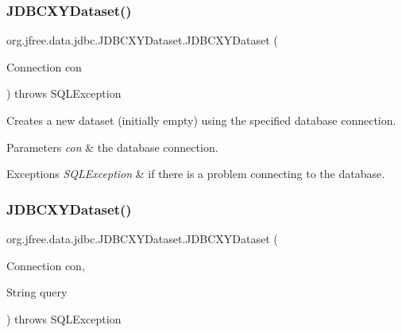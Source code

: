 \subsubsection{\texorpdfstring{J\+D\+B\+C\+X\+Y\+Dataset()}{JDBCXYDataset()}\hspace{0.1cm}{\footnotesize\ttfamily [2/3]}}
{\footnotesize\ttfamily org.\+jfree.\+data.\+jdbc.\+J\+D\+B\+C\+X\+Y\+Dataset.\+J\+D\+B\+C\+X\+Y\+Dataset (\begin{DoxyParamCaption}\item[{Connection}]{con }\end{DoxyParamCaption}) throws S\+Q\+L\+Exception}

Creates a new dataset (initially empty) using the specified database connection.


\begin{DoxyParams}{Parameters}
{\em con} & the database connection.\\
\hline
\end{DoxyParams}

\begin{DoxyExceptions}{Exceptions}
{\em S\+Q\+L\+Exception} & if there is a problem connecting to the database. \\
\hline
\end{DoxyExceptions}
\mbox{\label{classorg_1_1jfree_1_1data_1_1jdbc_1_1_j_d_b_c_x_y_dataset_afdd30de451cb1515ccb314be5516eb96}} 
\subsubsection{\texorpdfstring{J\+D\+B\+C\+X\+Y\+Dataset()}{JDBCXYDataset()}\hspace{0.1cm}{\footnotesize\ttfamily [3/3]}}
{\footnotesize\ttfamily org.\+jfree.\+data.\+jdbc.\+J\+D\+B\+C\+X\+Y\+Dataset.\+J\+D\+B\+C\+X\+Y\+Dataset (\begin{DoxyParamCaption}\item[{Connection}]{con,  }\item[{String}]{query }\end{DoxyParamCaption}) throws S\+Q\+L\+Exception}

